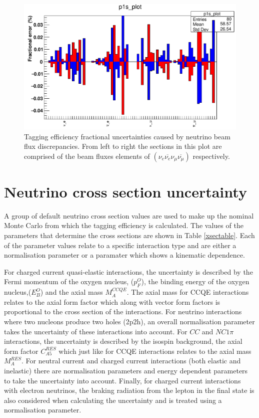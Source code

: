 \begin{figure}[H]
\includegraphics[scale=0.4]{Figures/flux_uncertainty.png}
\caption{Tagging efficiency fractional uncertainties caused by neutrino beam flux discrepancies. From left to right the sections in this plot are comprised of the beam fluxes elements of $\left(\nu_{e} \overline{\nu_{e}} \nu_{\mu} \overline{\nu_{\mu}}\right)$ respectively.}
\label{fig:fluxuncertainty}
\end{figure}

\section{Neutrino cross section uncertainty}

A group of default neutrino cross section values are used to make up the nominal Monte Carlo from which the tagging efficiency is calculated. The values of the parameters that determine the cross sections are shown in Table \ref{xsectable}. Each of the parameter values relate to a specific interaction type and are either a normalisation parameter or a paramater which shows a kinematic dependence. \newline

For charged current quasi-elastic interactions, the uncertainty is described by the Fermi momentum of the oxygen nucleus, ($p_{F}^{O}$), the binding energy of the oxygen nucleus,($E_{B}^{O}$) and the axial mass $M_{A}^{C C Q E}$. The axial mass for CCQE interactions relates to the axial form factor which along with vector form factors is proportional to the cross section of the interactions. For neutrino interactions where two nucleons produce two holes (2p2h), an overall normalisation parameter takes the uncertainty of these interactions into account. For $CC$ and $NC1\pi$ interactions, the uncertainty is described by the isospin background, the axial form factor $C_{A 5}^{R E S}$ which just like for CCQE interactions relates to the axial mass $M_{A}^{R E S}$. For neutral current and charged current interactions (both elastic and inelastic) there are normalisation parameters and energy dependent parameters to take the uncertainty into account. Finally, for charged current interactions with electron neutrinos, the braking radiation from the lepton in the final state is also considered when calculating the uncertainty and is treated using a normalisation parameter.
\newline

